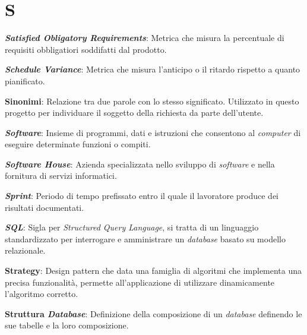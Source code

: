\documentclass[5pt]{article}
\begin{document}
\section*{S}
\begin{flushleft}
	
\textbf{\textit{Satisfied Obligatory Requirements}}: Metrica che misura la percentuale di requisiti obbligatiori soddifatti dal prodotto.\newline

\textbf{\textit{Schedule Variance}}: Metrica che misura l'anticipo o il ritardo rispetto a quanto pianificato.\newline

\textbf{Sinonimi}: Relazione tra due parole con lo stesso significato. Utilizzato in questo progetto per individuare il soggetto della richiesta da parte dell'utente.\newline

\textbf{\textit{Software}}: Insieme di programmi, dati e istruzioni che consentono al \textit{computer} di eseguire determinate funzioni o compiti.\newline

\textbf{\textit{Software House}}: Azienda specializzata nello sviluppo di \textit{software} e nella fornitura di servizi informatici.\newline

\textbf{\textit{Sprint}}: Periodo di tempo prefissato entro il quale il lavoratore produce dei risultati documentati.\newline

\textbf{\textit{SQL}}: Sigla per \textit{Structured Query Language}, si tratta di un linguaggio standardizzato per interrogare e amministrare un \textit{database} basato su modello relazionale.\newline

\textbf{Strategy}: Design pattern che data una famiglia di algoritmi che implementa una precisa funzionalità, permette all'applicazione di utilizzare dinamicamente l'algoritmo corretto.\newline

\textbf{Struttura \textit{Database}}: Definizione della composizione di un \textit{database} definendo le sue tabelle e la loro composizione.\newline

\end{flushleft}
\end{document}
